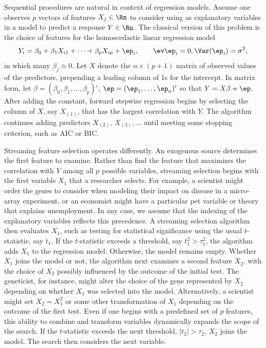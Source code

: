 \documentclass[12pt]{article}
\begin{document}
 Sequential procedures are natural in context of regression models.  Assume one
 observes $p$ vectors of features $X_j \in \Rn$ to consider using as explanatory
 variables in a model to predict a response $Y \in \Rn$.  The classical version
 of this problem is the choice of features for the homoscedastic linear
 regression model
 \begin{equation}
   Y_i = \beta_0 + \beta_1 X_{i1} + \cdots + \beta_p X_{ip} + \ep_i, 
     \qquad \ev \ep_i = 0, \Var(\ep_i)=\sigma^2,
 \label{eq:regr}
 \end{equation}
 in which many $\beta_j \approx 0$. Let $X$ denote the $n\times (p+1)$ matrix of
 observed values of the predictors, prepending a leading column of 1s for the
 intercept.  In matrix form, let $\beta = (\beta_0, \beta_1, \ldots, \beta_p)'$,
 $\ep = (\ep_1,\ldots,\ep_n)'$ so that $Y = X\beta + \ep$.  After adding the
 constant, forward stepwise regression begins by selecting the column of $X$,
 say $X_{(1)}$, that has the largest correlation with $Y$.  The algorithm
 continues adding predictors $X_{(2)},\, X_{(3)}, \ldots$ until meeting some
 stopping criterion, such as AIC or BIC.

 
 Streaming feature selection operates differently.  An exogenous source
 determines the first feature to examine.  Rather than find the feature that
 maximizes the correlation with $Y$ among all $p$ possible variables, streaming
 selection begins with the first variable $X_1$ that a researcher selects.  For
 example, a scientist might order the genes to consider when modeling their
 impact on disease in a micro-array experiment, or an economist might have a
 particular pet variable or theory that explains unemployment.  In any case, we
 assume that the indexing of the explanatory variables reflects this precedence.
  A streaming selection algorithm then evaluates $X_1$, such as testing for
 statistical significance using the usual $t$-statistic, say $t_1$.  If the
 $t$-statistic exceeds a threshold, say $t_1^2 > \tau_1^2$, the algorithm adds
 $X_1$ to the regression model.  Otherwise, the model remains empty.  Whether
 $X_1$ joins the model or not, the algorithm next examines a second feature
 $X_2$, with the choice of $X_2$ possibly influenced by the outcome of the
 initial test.  The geneticist, for instance, might alter the choice of the gene
 represented by $X_2$ depending on whether $X_1$ was selected into the model.
  Alternatively, a scientist might set $X_2 = X_1^2$ or some other
 transformation of $X_1$ depending on the outcome of the first test.  Even if
 one begins with a predefined set of $p$ features, this ability to combine and
 transform variables dynamically expands the scope of the search.  If the
 $t$-statistic exceeds the next threshold, $|t_2| > \tau_2$, $X_2$ joins the
 model.  The search then considers the next variable.  
\end{document}
